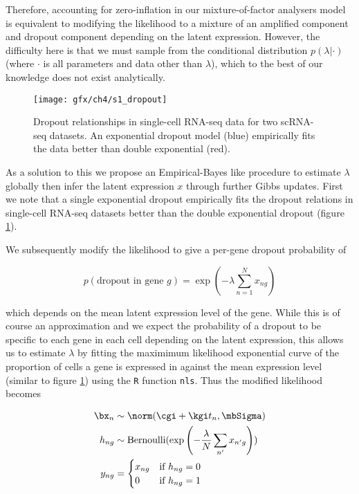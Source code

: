 Therefore, accounting for zero-inflation in our mixture-of-factor analysers model is equivalent to modifying the likelihood to a mixture of an amplified component and dropout component depending on the latent expression. However, the difficulty here is that we must sample from the conditional distribution $p(\lambda | \cdot)$ (where $\cdot$ is all parameters and data other than $\lambda$), which to the best of our knowledge does not exist analytically.

\begin{figure}%
	\centering
	\texttt{[image: gfx/ch4/s1\_dropout]}
	\caption{Dropout relationships in single-cell RNA-seq data for two scRNA-seq datasets. An exponential dropout model (blue) empirically fits the data better than double exponential (red).} \label{fig:dropout}
\end{figure}

As a solution to this we propose an Empirical-Bayes like procedure to estimate $\lambda$ globally then infer the latent expression $x$ through further Gibbs updates. First we note that a single exponential dropout empirically fits the dropout relations in single-cell RNA-seq datasets better than the double exponential dropout (figure \ref{fig:dropout}).

We subsequently modify the likelihood to give a per-gene dropout probability of

\begin{equation}
p(\text{dropout in gene $g$}) = \exp(-\lambda \sum_{n=1}^N x_{ng})
\end{equation}

 which depends on the mean latent expression level of the gene. While this is of course an approximation and we expect the probability of a dropout to be specific to each gene in each cell depending on the latent expression, this allows us to estimate $\lambda$ by fitting the maximimum likelihood exponential curve of the proportion of cells a gene is expressed in against the mean expression level (similar to figure \ref{fig:dropout}) using the \texttt{R} function \texttt{nls}. Thus the modified likelihood becomes

\begin{equation}
\begin{aligned}
\bx_n & \sim \norm(\cgi + \kgi t_n,\mbSigma) \\
h_{ng} & \sim \mathrm{Bernoulli}(\exp\left(-\frac{\lambda}{N} \sum_{n'} x_{n'g} \right)) \\
y_{ng} & = \begin{cases} x_{ng} &\mbox{if $h_{ng} = 0$}  \\
0 & \mbox{if $h_{ng} = 1$} \end{cases}
\end{aligned}
\end{equation}

